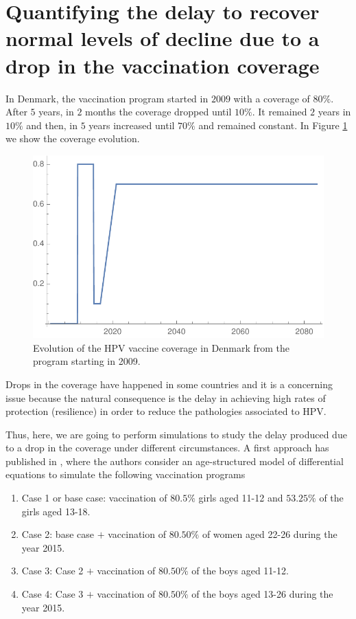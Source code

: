 \section{Quantifying the delay to recover normal levels of decline due to a drop in the vaccination coverage}\label{Resilence}
In Denmark, the vaccination program started in $2009$ with a coverage of $80\%$. After $5$ years, in $2$ months the coverage dropped until $10\%$. It remained $2$ years in $10\%$ and then, in $5$ years increased until $70\%$ and remained constant. In Figure \ref{fig:cobertura_danesa} we show the coverage evolution. 

\begin{figure}[h!]
	\centering
	\includegraphics[width=0.5\linewidth]{IMGs/11.-Resilencia/Cobertura_Danesa.pdf}
	\caption{Evolution of the HPV vaccine coverage in Denmark from the program starting in 2009.}
	\label{fig:cobertura_danesa}
\end{figure}

Drops in the coverage have happened in some countries and it is a concerning issue because the natural consequence is the delay in achieving high rates of protection (resilience) in order to reduce the pathologies associated to HPV.

Thus, here, we are going to perform simulations to study the delay produced due to a drop in the coverage under different circumstances. A first approach has published in \cite{Elfstrm2015}, where the authors consider an age-structured model of differential equations \cite{Baussano2013} to simulate the following vaccination programs

\begin{enumerate}
	\item Case 1 or base case: vaccination of $80.5\%$ girls aged 11-12 and $53.25\%$ of the girls aged 13-18.
	\item Case 2: base case $+$ vaccination of $80.50\%$ of women aged 22-26 during the year 2015.
	\item Case 3: Case 2 $+$ vaccination of $80.50\%$ of the boys aged 11-12.
	\item Case 4: Case 3 $+$ vaccination of $80.50\%$ of the boys aged 13-26 during the year 2015.
\end{enumerate}

